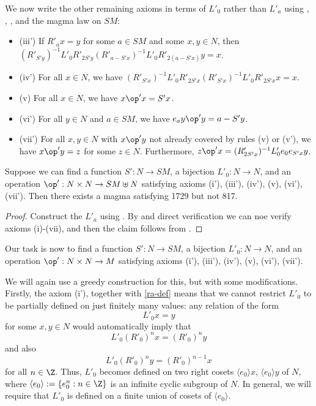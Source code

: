 We now write the other remaining axioms in terms of $L'_0$ rather than $L'_a$ using , , , and the magma law on $SM$:
\begin{itemize}
\item (iii')  If $R'_a x = y$ for some $a \in SM$ and some $x,y \in N$, then $(R'_{S'y})^{-1} L'_0 R'_{2S'y} (R'_{a - S'x})^{-1} L'_0 R'_{2(a - S'x)} y = x$.
\item (iv')  For all $x \in N$, we have $(R'_{S'x})^{-1} L'_0 R'_{2S'x} (R'_{S'x})^{-1} L'_0 R'_{2S'x} x = x$.
\item (v)  For all $x \in N$, we have $x \op' x = S'x$.
\item (vi')  For all $y \in N$ and $a \in SM$, we have $e_a y \op' y = a - S'y$.
\item (vii')  For all $x,y \in N$ with $x \op' y$ not already covered by rules (v) or (v'), we have $x \op' y = z$ for some $z \in N$.  Furthermore, $z \op' x = (R'_{2S'x})^{-1} L'_0 e_0 e_{S'x} y$.
\end{itemize}

\begin{lemma}\label{axiom-reduce}\label{Eq1729.reduce_to_new_axioms}\leanok  Suppose we can find a function $S': N \to SM$, a bijection $L'_0: N \to N$, and an operation $\op': N \times N \to SM \uplus N$ satisfying axioms (i'), (iii'), (iv'), (v), (vi'), (vii').  Then there exists a magma satisfying 1729 but not 817.
\end{lemma}

\begin{proof}\leanok  Construct the $L'_a$ using .  By  and direct verification we can noe verify axioms (i)-(vii), and then the claim follows from .
\end{proof}

Our task is now to find a function $S': N \to SM$, a bijection $L'_0: N \to N$, and an operation $\op': N \times N \to M$ satisfying axioms (i'), (iii'), (iv'), (v), (vi'), (vii').

We will again use a greedy construction for this, but with some modifications.  Firstly, the axiom (i'), together with \eqref{ra-def} means that we cannot restrict $L'_0$ to be partially defined on just finitely many values: any relation of the form
$$ L'_0 x = y$$
for some $x,y \in N$ would automatically imply that
\begin{equation}\label{itero}
 L'_0 (R'_0)^n x = (R'_0)^n y
\end{equation}
and also
\begin{equation}\label{itero-2}
  L'_0 (R'_0)^n y = (R'_0)^{n-1} x
\end{equation}
for all $n \in \Z$.  Thus, $L'_0$ becomes defined on two right cosets $\langle e_0 \rangle x$, $\langle e_0 \rangle y$ of $N$, where $\langle e_0 \rangle := \{ e_0^n: n \in \Z\}$ is an infinite cyclic subgroup of $N$.  In general, we will require that $L'_0$ is defined on a finite union of cosets of $\langle e_0\rangle$.

